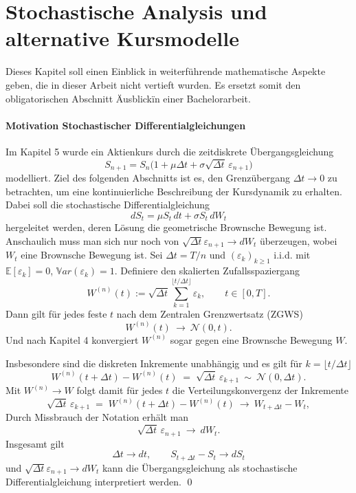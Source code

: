 \section{Stochastische Analysis und alternative Kursmodelle}

Dieses Kapitel soll einen Einblick in weiterführende mathematische Aspekte geben, die in dieser Arbeit nicht vertieft wurden.
Es ersetzt somit den obligatorischen Abschnitt \"Ausblick\" in einer Bachelorarbeit.

\paragraph{Motivation Stochastischer Differentialgleichungen}

Im Kapitel 5 wurde ein Aktienkurs durch die zeitdiskrete Übergangsgleichung
$$S_{n+1} = S_n \big(1 + \mu \Delta t + \sigma \sqrt{\Delta t}\,\varepsilon_{n+1}\big)$$
modelliert. Ziel des folgenden Abschnitts ist es, den Grenzübergang $\Delta t \to 0$ zu betrachten,
um eine kontinuierliche Beschreibung der Kursdynamik zu erhalten. Dabei soll die stochastische Differentialgleichung
$$dS_t = \mu S_t\,dt + \sigma S_t\,dW_t$$
hergeleitet werden, deren Lösung die geometrische Brownsche Bewegung ist. 
Anschaulich muss man sich nur noch von $\sqrt{\Delta t} \varepsilon_{n+1} \to dW_t$ überzeugen, wobei $W_t$ eine Brownsche Bewegung ist.
Sei $\Delta t = T/n$ und $(\varepsilon_k)_{k\ge 1}$ i.i.d. mit $\mathbb E[\varepsilon_k]=0$, $\mathbb Var(\varepsilon_k)=1$.
Definiere den skalierten Zufallsspaziergang
$$
W^{(n)}(t) := \sqrt{\Delta t}\sum_{k=1}^{\lfloor t/\Delta t\rfloor}\varepsilon_k,\qquad t\in[0,T].
$$
Dann gilt für jedes feste $t$ nach dem Zentralen Grenzwertsatz (ZGWS)
$$
W^{(n)}(t)\ \to\ \mathcal N(0,t).
$$
Und nach Kapitel 4 konvergiert $W^{(n)}$ sogar gegen eine Brownsche Bewegung $W$.

Insbesondere sind die diskreten Inkremente unabhängig und es gilt für $k=\lfloor t/\Delta t\rfloor$
$$
W^{(n)}(t+\Delta t)-W^{(n)}(t)\;=\;\sqrt{\Delta t}\,\varepsilon_{k+1}\ \sim\ \mathcal N(0,\Delta t).
$$
Mit $W^{(n)}\to W$ folgt damit für jedes $t$ die Verteilungskonvergenz der Inkremente
$$
\sqrt{\Delta t}\,\varepsilon_{k+1}
\;=\;W^{(n)}(t+\Delta t)-W^{(n)}(t)\ \to \ W_{t+\Delta t}-W_t,
$$
Durch Missbrauch der Notation erhält man
$$
\sqrt{\Delta t}\,\varepsilon_{n+1}\ \to\ dW_t.
$$
Insgesamt gilt
$$\Delta t \to dt, \qquad S_{t + \Delta t} - S_t \to dS_t$$
und $\sqrt{\Delta t} \varepsilon_{n+1} \to dW_t$
kann die Übergangsgleichung als stochastische Differentialgleichung interpretiert werden.
\qed

